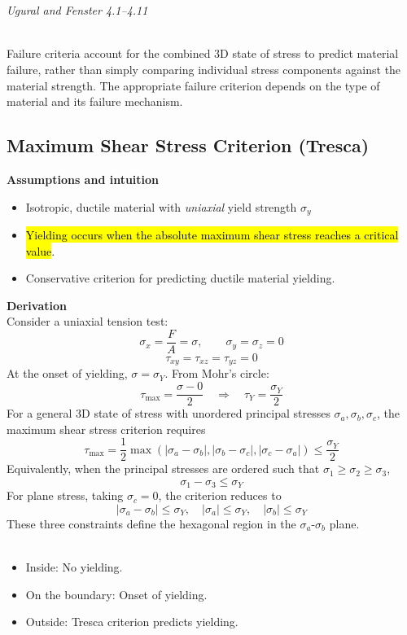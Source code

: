 ﻿\documentclass[12pt]{article}
\begin{document}
\section*{}
\vspace{-0.5em}
{\small\textit{Ugural and Fenster 4.1--4.11}}
\\
Failure criteria account for the combined 3D state of stress to predict material failure, rather than simply comparing individual stress components against the material strength. The appropriate failure criterion depends on the type of material and its failure mechanism.
\subsection*{Maximum Shear Stress Criterion (Tresca)}
\textbf{Assumptions and intuition}
\begin{itemize}
    \item Isotropic, ductile material with \textit{uniaxial} yield strength \(\sigma_y\)
    \item \hl{Yielding occurs when the absolute maximum shear stress reaches a critical value}.
    \item Conservative criterion for predicting ductile material yielding.
\end{itemize}
\textbf{Derivation}\\
Consider a uniaxial tension test:
\[
\sigma_x=\frac{F}{A}=\sigma,\qquad \sigma_y=\sigma_z=0
\]
\[
\tau_{xy}=\tau_{xz}=\tau_{yz}=0
\]
At the onset of yielding, \(\sigma=\sigma_Y\). From Mohr's circle:
\[
\tau_{\max}=\frac{\sigma-0}{2}
\quad\Rightarrow\quad
\tau_Y=\frac{\sigma_Y}{2}
\]
For a general 3D state of stress with unordered principal stresses
$\sigma_a,\sigma_b,\sigma_c$, the maximum shear stress criterion requires
\[
\boxed{
\tau_{\max}=\frac{1}{2}\max\left(
|\sigma_a-\sigma_b|,
|\sigma_b-\sigma_c|,
|\sigma_c-\sigma_a|
\right)\leq\frac{\sigma_Y}{2}
}
\]
Equivalently, when the principal stresses are ordered such that
$\sigma_1\geq\sigma_2\geq\sigma_3$,
\[
\boxed{\sigma_1-\sigma_3\leq\sigma_Y}
\]
For plane stress, taking $\sigma_c=0$, the criterion reduces to
\[
|\sigma_a-\sigma_b|\leq\sigma_Y,\quad
|\sigma_a|\leq\sigma_Y,\quad
|\sigma_b|\leq\sigma_Y
\]
These three constraints define the hexagonal region in the
$\sigma_a$-$\sigma_b$ plane.\\\\
\noindent
\begin{minipage}[t]{0.55\textwidth}
    \vspace{0pt}
    \begin{itemize}
        \item Inside: No yielding.
        \item On the boundary: Onset of yielding.
        \item Outside: Tresca criterion predicts yielding.
    \end{itemize}
\end{minipage}
\end{document}
